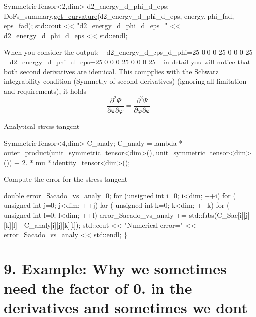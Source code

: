 \begin{DoxyCode}
SymmetricTensor<2,dim> d2\_energy\_d\_phi\_d\_eps;
DoFs\_summary.\hyperlink{classSacado__Wrapper_1_1DoFs__summary_adf29bfda10814ecee9572a4751d34db0}{get\_curvature}(d2\_energy\_d\_phi\_d\_eps, energy, phi\_fad, eps\_fad);
std::cout << \textcolor{stringliteral}{"d2\_energy\_d\_phi\_d\_eps="} << d2\_energy\_d\_phi\_d\_eps << std::endl;
\end{DoxyCode}
 When you consider the output\+: ~\newline
d2\+\_\+energy\+\_\+d\+\_\+eps\+\_\+d\+\_\+phi=25 0 0 0 25 0 0 0 25 ~\newline
d2\+\_\+energy\+\_\+d\+\_\+phi\+\_\+d\+\_\+eps=25 0 0 0 25 0 0 0 25 ~\newline
in detail you will notice that both second derivatives are identical. This compplies with the Schwarz integrability condition (Symmetry of second derivatives) (ignoring all limitation and requirements), it holds \[ \frac{\partial^2 \Psi}{\partial \boldsymbol{\varepsilon} \partial \varphi} = \frac{\partial^2 \Psi}{\partial \varphi \partial \boldsymbol{\varepsilon}} \]

Analytical stress tangent 
\begin{DoxyCode}
SymmetricTensor<4,dim> C\_analy;
C\_analy = lambda * outer\_product(unit\_symmetric\_tensor<dim>(), unit\_symmetric\_tensor<dim>()) + 2. * mu * 
      identity\_tensor<dim>();
\end{DoxyCode}
 Compute the error for the stress tangent 
\begin{DoxyCode}
     \textcolor{keywordtype}{double} error\_Sacado\_vs\_analy=0;
     \textcolor{keywordflow}{for} (\textcolor{keywordtype}{unsigned} \textcolor{keywordtype}{int} i=0; i<dim; ++i)
        \textcolor{keywordflow}{for} ( \textcolor{keywordtype}{unsigned} \textcolor{keywordtype}{int} j=0; j<dim; ++j)
            \textcolor{keywordflow}{for} ( \textcolor{keywordtype}{unsigned} \textcolor{keywordtype}{int} k=0; k<dim; ++k)
                \textcolor{keywordflow}{for} ( \textcolor{keywordtype}{unsigned} \textcolor{keywordtype}{int} l=0; l<dim; ++l)
                    error\_Sacado\_vs\_analy += std::fabs(C\_Sac[i][j][k][l] - C\_analy[i][j][k][l]);
     std::cout << \textcolor{stringliteral}{"Numerical error="} << error\_Sacado\_vs\_analy << std::endl;
\}
\end{DoxyCode}
 \hypertarget{index_Ex9}{}\section{9. Example\+: Why we sometimes need the factor of 0. in the derivatives and sometimes we don\textquotesingle{}t}\label{index_Ex9}

